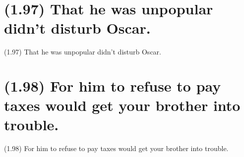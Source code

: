 \documentclass{article}
\begin{document}
\clearpage

%
%

\section*{(1.97) That he was unpopular didn't disturb Oscar.}

\bigbreak
\begin{enumerate*}
\item[(1.97)] That he was unpopular didn't disturb Oscar.
\end{enumerate*}
\bigbreak

\bigbreak
\begin{minipage}{\textwidth}
\end{minipage}
\bigbreak

\clearpage

%
%

\section*{(1.98) For him to refuse to pay taxes would get your brother into trouble.}

\bigbreak
\begin{enumerate*}
\item[(1.98)] For him to refuse to pay taxes would get your brother into trouble.
\end{enumerate*}
\bigbreak

\bigbreak
\begin{minipage}{\textwidth}
\end{minipage}
\bigbreak
\end{document}
